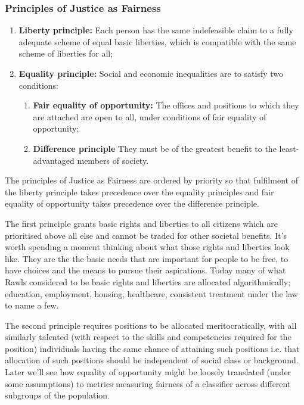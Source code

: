 \subsubsection*{Principles of Justice as Fairness}
%
\begin{enumerate}[leftmargin=*]
\item \textbf{Liberty principle:} Each person has the same indefeasible claim to a fully adequate scheme of equal basic liberties, which is compatible with the same scheme of liberties for all;
\item \textbf{Equality principle:} Social and economic inequalities are to satisfy two conditions:
\begin{enumerate}[leftmargin=*]
\item \textbf{Fair equality of opportunity:} The offices and positions to which they are attached are open to all, under conditions of fair equality of opportunity;
\item \textbf{Difference principle} They must be of the greatest benefit to the least-advantaged members of society.
\end{enumerate}
\end{enumerate}
The principles of Justice as Fairness are ordered by priority so that fulfilment of the liberty principle takes precedence over the equality principles and fair equality of opportunity takes precedence over the difference principle.

The first principle grants basic rights and liberties to all citizens which are prioritised above all else and cannot be traded for other societal benefits. It's worth spending a moment thinking about what those rights and liberties look like. They are the the basic needs that are important for people to be free, to have choices and the means to pursue their aspirations. Today many of what Rawls considered to be basic rights and liberties are allocated algorithmically; education, employment, housing, healthcare, consistent treatment under the law to name a few.

The second principle requires positions to be allocated meritocratically, with all similarly talented (with respect to the skills and competencies required for the position) individuals having the same chance of attaining such positions i.e. that allocation of such positions should be independent of social class or background. Later we'll see how equality of opportunity might be loosely translated (under some assumptions) to metrics measuring fairness of a classifier across different subgroups of the population.

